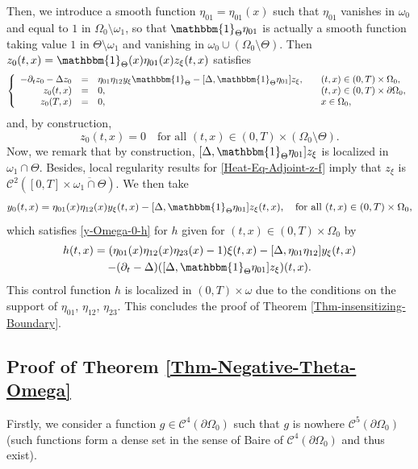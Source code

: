 \documentclass[JEP,XML,SOM,Unicode,NoFloatCountersInSection]{cedram}
\theoremstyle{definition}
\begin{document}
Then, we introduce a smooth function $\eta_{01} = \eta_{01}(x)$ such that $\eta_{01}$ vanishes in $ \omega_0$ and equal to $1$ in $\Omega_0 \setminus \omega_1$, so that $\mathbbm{1}_\Theta \eta_{01}$ is actually a smooth function taking value $1$ in $\Theta \setminus \omega_1$ and vanishing in $\omega_0 \cup (\Omega_0 \setminus \Theta)$. Then $ z_0(t,x)= \mathbbm{1}_\Theta(x) \eta_{01}(x) z_\xi(t,x)$ satisfies
\begin{equation*}
\left\{
\begin{array}{rcll}
- \partial_t z_0 - \Delta z_0 &=& \eta_{01} \eta_{12} y_\xi \mathbbm{1}_{\Theta}
- [\Delta, \mathbbm{1}_\Theta \eta_{01}] z_\xi
, \quad & (t,x) \in (0,T) \times \Omega_0,
\\
z_0(t, x) &=& 0, \quad & (t,x) \in (0,T) \times \partial \Omega_0,
\\
z_0(T,x) &=& 0, \quad & x \in \Omega_0,
\end{array}
\right.
\end{equation*}
and, by construction,
\[
z_0(t,x) = 0 \quad\text{for all } (t,x) \in (0,T) \times (\Omega_0 \setminus \Theta).
\]
Now, we remark that by construction, $[\Delta, \mathbbm{1}_\Theta \eta_{01}] z_\xi$ is localized in $\omega_1 \cap \Theta$. Besides, local regularity results for \eqref{Heat-Eq-Adjoint-z-f} imply that $z_\xi$ is $\mathscr{C}^2([0,T] \times \overline{\omega_1 \cap \Theta})$. We then take
\[
y_0(t,x) = \eta_{01}(x) \eta_{12}(x) y_\xi(t,x) - [\Delta, \mathbbm{1}_\Theta \eta_{01} ] z_\xi(t,x), \quad \text{for all } (t,x) \in (0,T) \times \Omega_0,
\]
which satisfies \eqref{y-Omega-0-h} for $h$ given for $(t,x) \in (0,T) \times \Omega_0$ by
\begin{multline*}
h(t,x) = (\eta_{01}(x) \eta_{12}(x) \eta_{23}(x)-1) \xi(t,x) - [\Delta, \eta_{01} \eta_{12}] y_\xi(t,x)\\
- (\partial_t - \Delta) ([\Delta, \mathbbm{1}_\Theta \eta_{01}] z_\xi)(t,x).
\end{multline*}
This control function $h$ is localized in $(0,T) \times \omega$ due to the conditions on the support of $\eta_{01}$, $\eta_{12}$, $\eta_{23}$. This concludes the proof of Theorem \ref{Thm-insensitizing-Boundary}.

\subsection{Proof of Theorem \ref{Thm-Negative-Theta-Omega}}
\label{Sec-Proof-Thm-Negative-Theta-Omega}

Firstly, we consider a function $g \in \mathscr{C}^4(\partial\Omega_0)$ such that $g$ is nowhere $\mathscr{C}^5(\partial \Omega_0)$ (such functions form a dense set in the sense of Baire of $\mathscr{C}^4(\partial \Omega_0)$ and thus exist).
\end{document}
